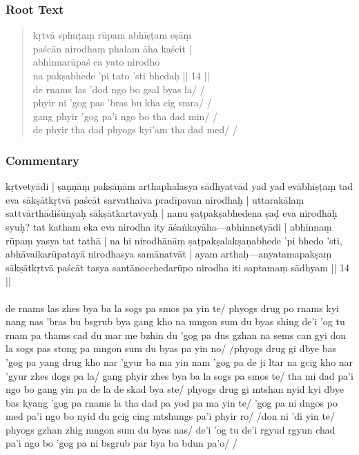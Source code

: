 \documentclass[12pt]{article}
\newcommand{\emdash} {\hspace{0em}—\hspace{0em}}
\begin{document}
\subsubsection{Root Text}
\begin{quote}
	kṛtvā sphuṭaṃ rūpam abhīṣṭam eṣāṃ \\
	paścān nirodhaṃ phalam āha kaścit |\\
	abhinnarūpaś ca yato nirodho \\
	na pakṣabhede 'pi tato 'sti bhedaḥ || 14 ||\\

	de rnams las 'dod ngo bo gsal byas la/ /\\
	phyir ni 'gog pas 'bras bu kha cig smra/ /\\
	gang phyir 'gog pa'i ngo bo tha dad min/ /\\
	de phyir tha dad phyogs kyi'am tha dad med/ / 
\end{quote}

\subsubsection{Commentary}
kṛtvetyādi | ṣaṇṇāṃ pakṣāṇām arthaphalasya sādhyatvād yad yad evābhīṣṭaṃ tad eva sākṣātkṛtvā paścāt sarvathaiva pradīpavan nirodhaḥ | uttarakālaṃ sattvārthādiśūnyaḥ sākṣātkartavyaḥ | nanu ṣaṭpakṣabhedena ṣaḍ eva nirodhāḥ syuḥ? tat katham eka eva nirodha ity āśaṅkayāha\emdash abhinnetyādi | abhinnaṃ rūpaṃ yasya tat tathā | na hi nirodhānāṃ ṣaṭpakṣalakṣaṇabhede 'pi bhedo 'sti, abhāvaikarūpatayā nirodhasya samānatvāt | ayam arthaḥ\emdash anyatamapakṣaṃ sākṣātkṛtvā paścāt tasya santānocchedarūpo nirodha iti saptamaṃ sādhyam || 14 ||\\

\textbf{\TVA}\\
de rnams las zhes bya ba la sogs pa smos pa yin te/ phyogs drug po rnams kyi nang nas 'bras bu bsgrub bya gang kho na mngon sum du byas shing de'i 'og tu rnam pa thams cad du mar me bzhin du 'gog pa dus gzhan na sems can gyi don la sogs pas stong pa mngon sum du byas pa yin no/ /phyogs drug gi dbye bas 'gog pa yang drug kho nar 'gyur ba ma yin nam 'gog pa de ji ltar na gcig kho nar 'gyur zhes dogs pa la/ gang phyir zhes bya ba la sogs pa smos te/ tha mi dad pa'i ngo bo gang yin pa de la de skad bya ste/ phyogs drug gi mtshan nyid kyi dbye bas kyang 'gog pa rnams la tha dad pa yod pa ma yin te/ 'gog pa ni dngos po med pa'i ngo bo nyid du gcig cing mtshungs pa'i phyir ro/ /don ni 'di yin te/ phyogs gzhan zhig mngon sum du byas nas/ de'i 'og tu de'i rgyud rgyun chad pa'i ngo bo 'gog pa ni bsgrub par bya ba bdun pa'o/ /\\
\end{document}
